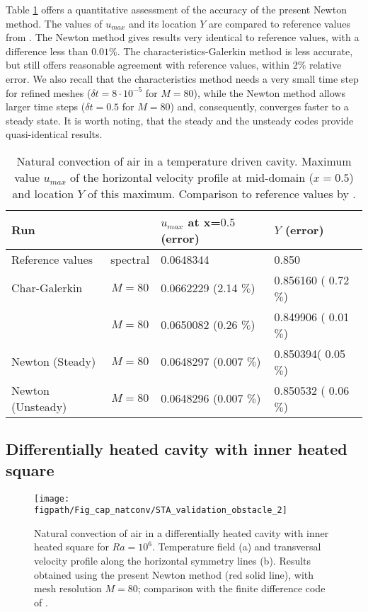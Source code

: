 Table \ref{tab-T1} offers a quantitative assessment of the accuracy of the present Newton method. The values of $u_{max}$  and its location $Y$ are compared to reference values from \cite{LeQuere91}. The Newton method gives results very identical to reference values, with a difference less than $0.01 \%$. 
The characteristics-Galerkin method is less accurate, but still offers reasonable agreement with reference values, within 2$\%$ relative error. We also recall that the characteristics method needs a very small time step for refined meshes ($\delta t = 8\cdot 10^{-5}$ for $M=80$), while the Newton method allows larger time steps ($\delta t = 0.5$ for $M=80$) and, consequently, converges faster to a steady state.
It is worth noting, that the steady and the unsteady codes provide quasi-identical results.
\begin{table}%
	\begin{center}
		\begin{tabular}{|l|c|l|l|}
			\hline
			\multicolumn{2}{|l|}{Run} & $u_{max}$ at x=$0.5$ (error) & $Y$ (error) \\
			\hline
			Reference values & spectral & 0.0648344           & 0.850 \\ \hline
			Char-Galerkin       &$M=80$ & 0.0662229 (2.14 $\%$) & 0.856160 ( 0.72 $\%$) \\ \hline
			\cite{dan-2014-JCP}              &$M=80$ & 0.0650082 (0.26 $\%$) & 0.849906 ( 0.01 $\%$) \\ \hline
			Newton (Steady)        &$M=80$ & 0.0648297 (0.007 $\%$) & 0.850394( 0.05 $\%$) \\ \hline
			Newton (Unsteady)        &$M=80$ & 0.0648296 (0.007 $\%$) & 0.850532 ( 0.06 $\%$) \\ \hline
		\end{tabular}
	\end{center}
	\caption {Natural convection of air in a temperature driven cavity. Maximum value $u_{max}$ of the horizontal velocity profile at mid-domain ($x=0.5$) and location $Y$ of this maximum. Comparison to reference values by \cite{LeQuere91}.}
	\label{tab-T1}
\end{table}

\subsection{Differentially heated cavity with inner heated square} \label{sub-2D-OBSTACLE}

\begin{figure}
	\begin{center}
		\texttt{[image: \\figpath/Fig\_cap\_natconv/STA\_validation\_obstacle\_2]} 
	\end{center}
	\caption{Natural convection of air in a differentially heated cavity with inner heated square for $Ra = 10^6$. Temperature field (a) and transversal velocity profile along the  horizontal symmetry lines (b). Results obtained using the present Newton method (red solid line), with mesh resolution $M=80$; comparison with the finite difference code of \cite{Raluca2013}.}
	\label{fig-obst-2D}
\end{figure}

